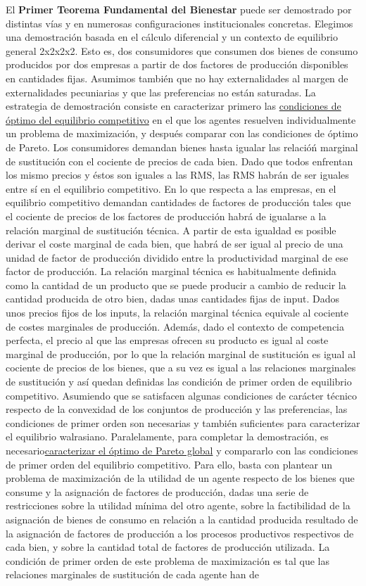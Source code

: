 \documentclass{nuevotema}
\begin{document}
El \textbf{Primer Teorema Fundamental del Bienestar} puede ser demostrado por distintas vías y en numerosas configuraciones institucionales concretas. Elegimos una demostración basada en el cálculo diferencial y un contexto de equilibrio general 2x2x2x2. Esto es, dos consumidores que consumen dos bienes de consumo producidos por dos empresas a partir de dos factores de producción disponibles en cantidades fijas. Asumimos también que no hay externalidades al margen de externalidades pecuniarias y que las preferencias no están saturadas. La estrategia de demostración consiste en caracterizar primero las \underline{condiciones de óptimo del equilibrio competitivo} en el que los agentes resuelven individualmente un problema de maximización, y después comparar con las condiciones de óptimo de Pareto. Los consumidores demandan bienes hasta igualar las relacióń marginal de sustitución con el cociente de precios de cada bien. Dado que todos enfrentan los mismo precios y éstos son iguales a las RMS, las RMS habrán de ser iguales entre sí en el equilibrio competitivo. En lo que respecta a las empresas, en el equilibrio competitivo demandan cantidades de factores de producción tales que el cociente de precios de los factores de producción habrá de igualarse a la relación marginal de sustitución técnica. A partir de esta igualdad es posible derivar el coste marginal de cada bien, que habrá de ser igual al precio de una unidad de factor de producción dividido entre la productividad marginal de ese factor de producción. La relación marginal técnica es habitualmente definida como la cantidad de un producto que se puede producir a cambio de reducir la cantidad producida de otro bien, dadas unas cantidades fijas de input. Dados unos precios fijos de los inputs, la relación marginal técnica equivale al cociente de costes marginales de producción. Además, dado el contexto de competencia perfecta, el precio al que las empresas ofrecen su producto es igual al coste marginal de producción, por lo que la relación marginal de sustitución es igual al cociente de precios de los bienes, que a su vez es igual a las relaciones marginales de sustitución y así quedan definidas las condición de primer orden de equilibrio competitivo. Asumiendo que se satisfacen algunas condiciones de carácter técnico respecto de la convexidad de los conjuntos de producción y las preferencias, las condiciones de primer orden son necesarias y también suficientes para caracterizar el equilibrio walrasiano. Paralelamente, para completar la demostración, es necesario\underline{caracterizar el óptimo de Pareto global} y compararlo con las condiciones de primer orden del equilibrio competitivo. Para ello, basta con plantear un problema de maximización de la utilidad de un agente respecto de los bienes que consume y la asignación de factores de producción, dadas una serie de restricciones sobre la utilidad mínima del otro agente, sobre la factibilidad de la asignación de bienes de consumo en relación a la cantidad producida resultado de la asignación de factores de producción a los procesos productivos respectivos de cada bien, y sobre la cantidad total de factores de producción utilizada. La condición de primer orden de este problema de maximización es tal que las relaciones marginales de sustitución de cada agente han de 
\end{document}
